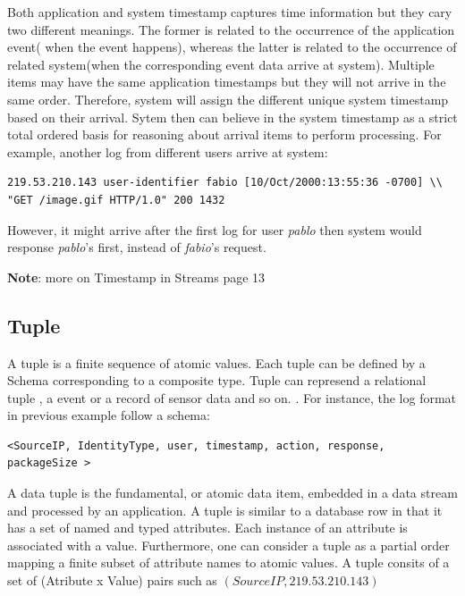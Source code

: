 Both application and system timestamp captures time information but they cary two different meanings. The former is related to the occurrence of the application event( when the event happens), whereas the latter is related to the occurrence of related system(when the corresponding event data arrive at system). Multiple items may have the same application timestamps but they will not arrive in the same order. Therefore, system will assign the different unique system timestamp based on their arrival. Sytem then can believe in the system timestamp as a strict total ordered basis for reasoning about arrival items to perform processing. For example, another log from different users arrive at system:
\begin{verbatim}
219.53.210.143 user-identifier fabio [10/Oct/2000:13:55:36 -0700] \\
"GET /image.gif HTTP/1.0" 200 1432
\end{verbatim}
However, it might arrive after the first log for user \textit{pablo} then system would response \textit{pablo}'s first, instead of \textit{fabio}'s request.

\textbf{Note}: more on Timestamp in Streams \citep{Babcock:2002} page 13

\subsection*{Tuple}
A tuple is a finite sequence of atomic values. Each tuple can be defined by a Schema corresponding to a composite type. Tuple can represend a relational tuple , a event or a record of sensor data and so on. \citep{Arasu:2006:CCQ}. For instance, the log format in previous example follow a schema:

\begin{verbatim}
<SourceIP, IdentityType, user, timestamp, action, response, packageSize >
\end{verbatim}

A data tuple is the fundamental, or atomic data item, embedded in a data stream and processed by an application. A tuple is similar to a database row in that it has a set of named and typed attributes. Each instance of an attribute is associated with a value\citep{Henrique:2014}. Furthermore, one can consider a tuple as a partial order mapping a finite subset of attribute names to atomic values\citep{Petit:2012}. A tuple consits of a set of (Atribute x Value) pairs such as $(SourceIP, 219.53.210.143)$



